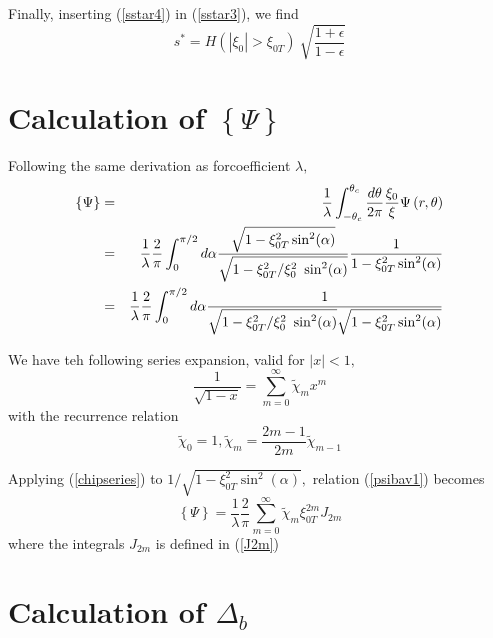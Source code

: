 Finally, inserting (\ref{sstar4}) in (\ref{sstar3}), we find
\begin{equation}
s^{*}=H(|\xi _{0}|>\xi _{0T})\ \sqrt{\frac{1+\epsilon }{1-\epsilon }}
\label{sstar}
\end{equation}

\section{Calculation of $\left\{ \Psi \right\} $}

Following the same derivation as forcoefficient  $\lambda ,$
\begin{eqnarray}
\left\{ \Psi \right\}  &=&\frac{1}{\lambda }\int_{-\theta _{c}}^{\theta _{c}}%
\frac{d\theta }{2\pi }\frac{\xi _{0}}{\xi }\Psi \left( r,\theta \right)
\nonumber \\
&=&\frac{1}{\lambda }\frac{2}{\pi }\int_{0}^{\pi /2}d\alpha \frac{\sqrt{%
1-\xi _{0T}^{2}\sin ^{2}(\alpha )}}{\sqrt{1-\xi _{0T}^{2}/\xi _{0}^{2}\ \sin
^{2}(\alpha )}}\frac{1}{1-\xi _{0T}^{2}\sin ^{2}(\alpha )}  \nonumber \\
&=&\frac{1}{\lambda }\frac{2}{\pi }\int_{0}^{\pi /2}d\alpha \frac{1}{\sqrt{%
1-\xi _{0T}^{2}/\xi _{0}^{2}\ \sin ^{2}(\alpha )}\sqrt{1-\xi _{0T}^{2}\sin
^{2}(\alpha )}}  \label{psibav1}
\end{eqnarray}

We have teh following series expansion, valid for $\left| x\right| <1,$%
\begin{equation}
\frac{1}{\sqrt{1-x}}=\sum_{m=0}^{\infty }\widetilde{\chi }_{m}x^{m}
\label{chipseries}
\end{equation}
with the recurrence relation
\begin{equation}
\widetilde{\chi }_{0}=1,\widetilde{\chi }_{m}=\frac{2m-1}{2m}\widetilde{\chi
}_{m-1}
\end{equation}

Applying (\ref{chipseries}) to $1/\sqrt{1-\xi _{0T}^{2}\sin ^{2}(\alpha )},$
relation (\ref{psibav1}) becomes
\begin{equation}
\left\{ \Psi \right\} =\frac{1}{\lambda }\frac{2}{\pi }\sum_{m=0}^{\infty }%
\widetilde{\chi }_{m}\xi _{0T}^{2m}J_{2m}
\end{equation}
where the integrals $J_{2m}$ is defined in (\ref{J2m})

\section{Calculation of $\Delta _{b}$}

